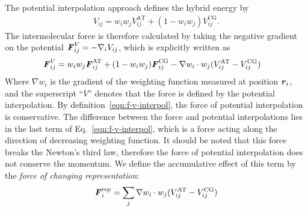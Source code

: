 \documentclass[epjST]{svjour}
\newcommand{\vect}[1]{\textbf{\textit{#1}}}
\newcommand{\AT}[0]{\textrm{AT}}
\newcommand{\CG}[0]{\textrm{CG}}
\newcommand{\moleidxone}[0]{i}
\newcommand{\moleidxtwo}[0]{j}
\newcommand{\rep}{{\textrm{rep}}}
\begin{document}
The potential interpolation approach defines the hybrid energy by
\begin{align}\label{eqn:v-v-interpol}
  {V}_{\moleidxone \moleidxtwo}=w_\moleidxone w_\moleidxtwo{V}_{\moleidxone\moleidxtwo}^{\AT}+(1-w_\moleidxone w_\moleidxtwo){V}^{\CG}_{\moleidxone\moleidxtwo}.
\end{align}
The intermolecular force is therefore calculated by taking the negative gradient on the potential ${\vect F}^V_{\moleidxone \moleidxtwo}= -\nabla_{\moleidxone}{V}_{\moleidxone \moleidxtwo}$,
which is explicitly written as
\begin{align}\label{eqn:f-v-interpol}
  {\vect F}^V_{\moleidxone \moleidxtwo}
  &=w_\moleidxone w_\moleidxtwo{\vect F}_{\moleidxone\moleidxtwo}^{\AT}+(1-w_\moleidxone w_\moleidxtwo){\vect F}^{\CG}_{\moleidxone\moleidxtwo}  - \nabla w_\moleidxone\cdot w_\moleidxtwo (V^\AT_{\moleidxone \moleidxtwo} - V^\CG_{\moleidxone \moleidxtwo})
\end{align}
Where $\nabla w_\moleidxone$ is the gradient of the weighting function measured at position $\vect r_\moleidxone$,
and the superscript ``$V$'' denotes that the force is defined
by the potential interpolation.
By  definition~\eqref{eqn:f-v-interpol}, the force of potential interpolation is conservative. 
The difference between the force and potential
interpolations lies in the last term  of Eq.~\eqref{eqn:f-v-interpol}, which is a force
acting along the direction of decreasing weighting function.
It should be noted that
this force breaks the Newton's third law, therefore the force of potential interpolation
does not conserve the momentum.
We define the accumulative effect of this term by the \emph{force of changing representation}:
\begin{align}
  \vect F_\moleidxone^\rep = \sum_{\moleidxtwo}  \nabla w_\moleidxone\cdot w_\moleidxtwo (V^\AT_{\moleidxone \moleidxtwo} - V^\CG_{\moleidxone \moleidxtwo})
\end{align}
\end{document}

